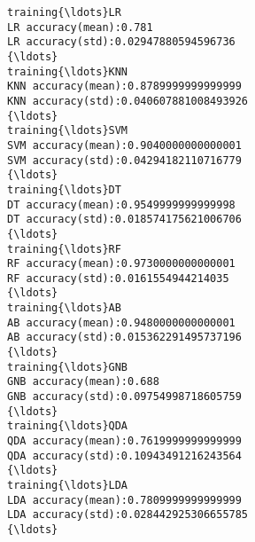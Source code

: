 \documentclass[11pt]{article}
\begin{document}
    \begin{Verbatim}[commandchars=\\\{\}]
training{\ldots}LR
LR accuracy(mean):0.781
LR accuracy(std):0.02947880594596736
{\ldots}
training{\ldots}KNN
KNN accuracy(mean):0.8789999999999999
KNN accuracy(std):0.040607881008493926
{\ldots}
training{\ldots}SVM
SVM accuracy(mean):0.9040000000000001
SVM accuracy(std):0.04294182110716779
{\ldots}
training{\ldots}DT
DT accuracy(mean):0.9549999999999998
DT accuracy(std):0.018574175621006706
{\ldots}
training{\ldots}RF
RF accuracy(mean):0.9730000000000001
RF accuracy(std):0.0161554944214035
{\ldots}
training{\ldots}AB
AB accuracy(mean):0.9480000000000001
AB accuracy(std):0.015362291495737196
{\ldots}
training{\ldots}GNB
GNB accuracy(mean):0.688
GNB accuracy(std):0.09754998718605759
{\ldots}
training{\ldots}QDA
QDA accuracy(mean):0.7619999999999999
QDA accuracy(std):0.10943491216243564
{\ldots}
training{\ldots}LDA
LDA accuracy(mean):0.7809999999999999
LDA accuracy(std):0.028442925306655785
{\ldots}

    \end{Verbatim}
\end{document}
